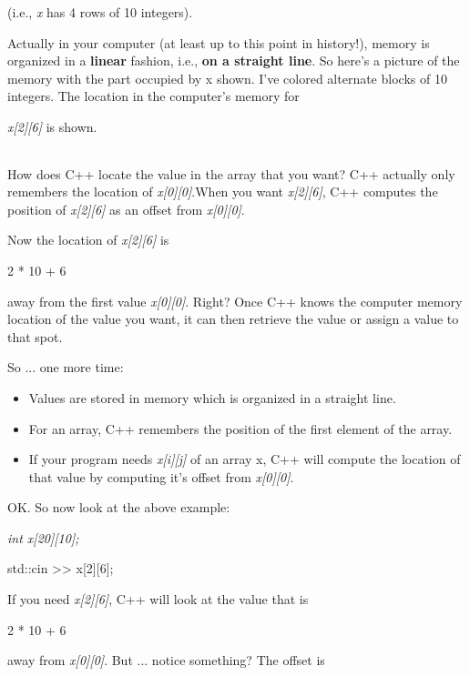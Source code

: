\documentclass[
]{article}
\providecommand{\tightlist}{%
  \setlength{\itemsep}{0pt}\setlength{\parskip}{0pt}}
\begin{document}
(i.e., \emph{x} has 4 rows of 10 integers).

Actually in your computer (at least up to this point in history!),
memory is organized in a \textbf{linear} fashion, i.e., \textbf{on a
straight line}. So here's a picture of the memory with the part occupied
by x shown. I've colored alternate blocks of 10 integers. The location
in the computer's memory for

\emph{x{[}2{]}{[}6{]}} is shown.

\begin{longtable}[]{@{}llllllllllllllllllllllllllllllllllllllll@{}}
\toprule
\endhead
& & & & & & & & & & & & & & & & & & & & & & & & & & & & & & & & & & & &
& & &\tabularnewline
\bottomrule
\end{longtable}

How does C++ locate the value in the array that you want? C++ actually
only remembers the location of \emph{x{[}0{]}{[}0{]}}.When you want
\emph{x{[}2{]}{[}6{]}}, C++ computes the position of
\emph{x{[}2{]}{[}6{]}} as an offset from \emph{x{[}0{]}{[}0{]}}.

Now the location of \emph{x{[}2{]}{[}6{]}} is

2 * 10 + 6

away from the first value \emph{x{[}0{]}{[}0{]}}. Right? Once C++ knows
the computer memory location of the value you want, it can then retrieve
the value or assign a value to that spot.

So ... one more time:

\begin{itemize}
\tightlist
\item
  Values are stored in memory which is organized in a straight line.
\item
  For an array, C++ remembers the position of the first element of the
  array.
\item
  If your program needs \emph{x{[}i{]}{[}j{]}} of an array x, C++ will
  compute the location of that value by computing it's offset from
  \emph{x{[}0{]}{[}0{]}}.
\end{itemize}

OK. So now look at the above example:

\emph{int x{[}20{]}{[}10{]};}

std::cin \textgreater\textgreater{} x{[}2{]}{[}6{]};

If you need \emph{x{[}2{]}{[}6{]}}, C++ will look at the value that is

2 * 10 + 6

away from \emph{x{[}0{]}{[}0{]}}. But ... notice something? The offset
is
\end{document}
